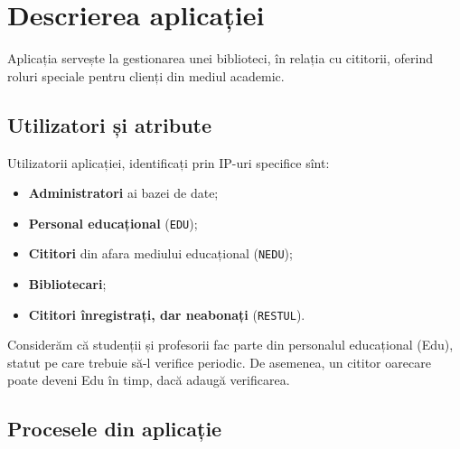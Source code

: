 
\chapter{Descrierea aplicației}

Aplicația servește la gestionarea unei biblioteci, în relația cu cititorii,
oferind roluri speciale pentru clienți din mediul academic.

\section{Utilizatori și atribute}
\label{sec:util-atr}

Utilizatorii aplicației, identificați prin IP-uri specifice sînt:
\begin{itemize}
\item \textbf{Administratori} ai bazei de date;
\item \textbf{Personal educațional} (\texttt{EDU});
\item \textbf{Cititori} din afara mediului educațional (\texttt{NEDU});
\item \textbf{Bibliotecari};
\item \textbf{Cititori înregistrați, dar neabonați} (\texttt{RESTUL}).
\end{itemize}

Considerăm că studenții și profesorii fac parte din personalul educațional
(Edu), statut pe care trebuie să-l verifice periodic. De asemenea, un
cititor oarecare poate deveni Edu în timp, dacă adaugă verificarea.

\section{Procesele din aplicație}
\label{sec:procese}

